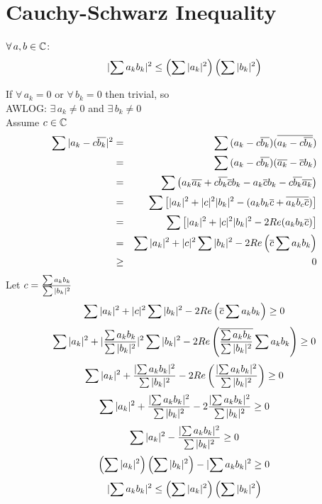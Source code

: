 \documentclass[letterpaper,12pt,fleqn]{article}
\renewcommand{\c}[1]{\overline{#1}}
\begin{document}
\section*{Cauchy-Schwarz Inequality}

\begin{theorem}
  $\forall\,a,b\in\mathbb{C}$:
  \[\lvert\sum{a_kb_k}\rvert^2\le
  \left(\sum{\lvert a_k\rvert^2}\right)\left(\sum{\lvert b_k\rvert^2}\right)\]
\end{theorem}

\begin{theproof}
  If $\forall\,a_k=0$ or $\forall\,b_k=0$ then trivial, so \\
  AWLOG: $\exists\,a_k\ne0$ and $\exists\,b_k\ne0$ \\
  Assume $c\in\mathbb{C}$
  \begin{eqnarray*}
    \sum{\abs{a_k-c\c{b_k}}^2} &=& \sum{(a_k-c\c{b_k})(\c{a_k-c\c{b_k}})} \\
    &=& \sum{(a_k-c\c{b_k})(\c{a_k}-\c{c}b_k)} \\
    &=& \sum{\left(a_k\c{a_k}+c\c{b_k}\c{c}b_k-a_k\c{c}b_k-c\c{b_k}\c{a_k}
      \right)} \\
    &=& \sum{\left[\abs{a_k}^2+\abs{c}^2\abs{b_k}^2-
        (a_kb_k\c{c}+\c{a_kb_c\c{c}})\right]} \\
    &=& \sum{\left[\abs{a_k}^2+\abs{c}^2\abs{b_k}^2-2Re(a_kb_k\c{c})\right]} \\
    &=& \sum{\abs{a_k}^2}+\abs{c}^2\sum{\abs{b_k}^2}-
    2Re\left(\c{c}\sum{a_kb_k}\right) \\
    &\ge& 0 \\
  \end{eqnarray*}
  Let $c=\frac{\sum{a_kb_k}}{\sum{\lvert b_k\rvert^2}}$
  \[\sum{\abs{a_k}^2}+\abs{c}^2\sum{\abs{b_k}^2}-    
  2Re\left(\c{c}\sum{a_kb_k}\right)\ge0\]
  \[\sum{\abs{a_k}^2}+
  \abs{\frac{\sum{a_kb_k}}{\sum{\abs{b_k}^2}}}^2\sum{\abs{b_k}^2}-    
  2Re\left(\c{\frac{\sum{a_kb_k}}{\sum{\abs{b_k}^2}}}\sum{a_kb_k}\right)\ge0\]
  \[\sum{\lvert a_k\rvert^2}+\frac{\lvert\sum{a_kb_k}\rvert^2}{\sum{\lvert b_k\rvert^2}}-
  2Re\left(\frac{\lvert\sum{a_kb_k}\rvert^2}{\sum{\lvert b_k\rvert^2}}\right)\ge0\]
  \[\sum{\lvert a_k\rvert^2}+\frac{\lvert\sum{a_kb_k}\rvert^2}{\sum{\lvert b_k\rvert^2}}-
  2\frac{\lvert\sum{a_kb_k}\rvert^2}{\sum{\lvert b_k\rvert^2}}\ge0\]
  \[\sum{\lvert a_k\rvert^2}-\frac{\lvert\sum{a_kb_k}\rvert^2}{\sum{\lvert b_k\rvert^2}}\ge0\]
  \[\left(\sum{\lvert a_k\rvert^2}\right)\left(\sum{\lvert b_k\rvert^2}\right)-
  \lvert\sum{a_kb_k}\rvert^2\ge0\]
  \[\lvert\sum{a_kb_k}\rvert^2\le
  \left(\sum{\lvert a_k\rvert^2}\right)\left(\sum{\lvert b_k\rvert^2}\right)\]
\end{theproof}
\end{document}
